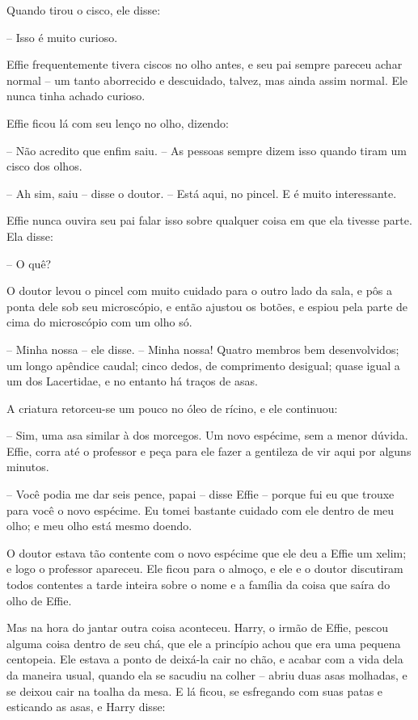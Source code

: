Quando tirou o cisco, ele disse:

-- Isso é muito curioso.

Effie frequentemente tivera ciscos no olho antes, e seu pai sempre
pareceu achar normal -- um tanto aborrecido e descuidado, talvez, mas
ainda assim normal. Ele nunca tinha achado curioso.

Effie ficou lá com seu lenço no olho, dizendo:

-- Não acredito que enfim saiu. -- As pessoas sempre dizem isso quando
tiram um cisco dos olhos.

-- Ah sim, saiu -- disse o doutor. -- Está aqui, no pincel. E é muito
interessante.

Effie nunca ouvira seu pai falar isso sobre qualquer coisa em que ela
tivesse parte. Ela disse:

-- O quê?

O doutor levou o pincel com muito cuidado para o outro lado da sala, e
pôs a ponta dele sob seu microscópio, e então ajustou os botões, e
espiou pela parte de cima do microscópio com um olho só.

-- Minha nossa -- ele disse. -- Minha nossa! Quatro membros bem
desenvolvidos; um longo apêndice caudal; cinco dedos, de comprimento
desigual; quase igual a um dos Lacertidae, e no entanto há traços de
asas. 

A criatura retorceu-se um pouco no óleo de rícino, e ele continuou:

-- Sim, uma asa similar à dos morcegos. Um novo espécime, sem a menor
dúvida. Effie, corra até o professor e peça para ele fazer a
gentileza de vir aqui por alguns minutos.

-- Você podia me dar seis pence, papai -- disse Effie -- porque fui eu
que trouxe para você o novo espécime. Eu tomei bastante cuidado com
ele dentro de meu olho; e meu olho está mesmo doendo.

O doutor estava tão contente com o novo espécime que ele deu a Effie
um xelim; e logo o professor apareceu. Ele ficou para o almoço, e ele
e o doutor discutiram todos contentes a tarde inteira sobre o nome e
a família da coisa que saíra do olho de Effie.

Mas na hora do jantar outra coisa aconteceu. Harry, o irmão de Effie,
pescou alguma coisa dentro de seu chá, que ele a princípio achou que
era uma pequena centopeia. Ele estava a ponto de deixá-la cair no
chão, e acabar com a vida dela da maneira usual, quando ela se
sacudiu na colher -- abriu duas asas molhadas, e se deixou cair na
toalha da mesa. E lá ficou, se esfregando com suas patas e esticando
as asas, e Harry disse:

